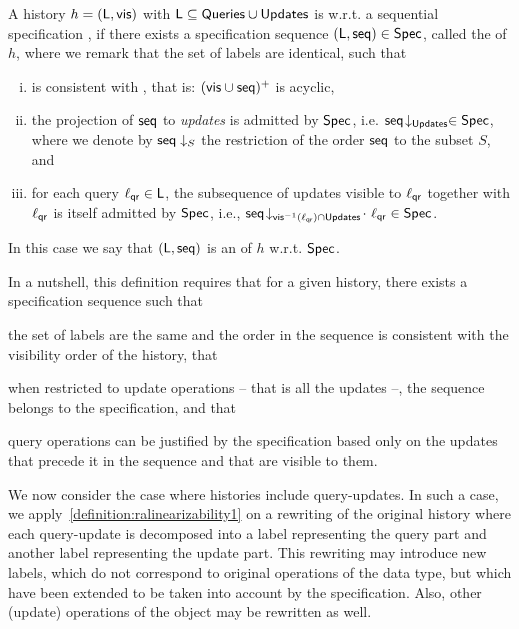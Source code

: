 \begin{definition}
  \label{definition:ralinearizability1} A history $h =
  (\mathsf{L},\mathsf{vis})$ with $\mathsf{L}\subseteq \mathsf{Queries}\cup\mathsf{Updates}$ is \crdtlinearizable{} w.r.t. a
   sequential specification
  \Spec{}, if there exists a specification sequence
  $(\mathsf{L}, \mathsf{seq}) \in \mathsf{Spec}{}$, called the
  \emph{\crdtlinearization{}} of $h$, where we remark that the set of labels
  are identical, such that %
  \begin{enumerate}[(i)]
  \item \aseqord{} is consistent with  \avisord{}, that is: $(\mathsf{vis}
    \cup \mathsf{seq})^{+}$ is acyclic,
  \item the projection of $\mathsf{seq}$ to \emph{updates} is
    admitted by $\mathsf{Spec}$, i.e.
    $\mathsf{seq}\!\downarrow_{\mathsf{Updates}} \in \mathsf{Spec}$, where we denote by
    $\mathsf{seq}\downarrow_{S}$ the restriction of the order $\mathsf{seq}$ to
    the subset $S$, and
  \item for each query $\ell_{\mathsf{qr}}\in \mathsf{L}$, the subsequence of updates visible to $\ell_{\mathsf{qr}}$ together with $\ell_{\mathsf{qr}}$ is itself admitted by $\mathsf{Spec}$, i.e., $\mathsf{seq}\!\downarrow_{\mathsf{vis}^{-1}(\ell_{\mathsf{qr}})\cap \mathsf{Updates}}\!\cdot\
    \ell_{\mathsf{qr}} \in \mathsf{Spec}$.
\end{enumerate}
In this case we say that $(\mathsf{L}, \mathsf{seq})$ is an \emph{\crdtlinearization{}} of $h$ w.r.t. $\mathsf{Spec}{}$.
\end{definition}

In a nutshell, this definition requires that for a given
history, there exists a specification sequence such
that
\begin{inparaenum}
\item the set of labels are the same and the order in the sequence is
  consistent with the visibility order of the history, that
\item when restricted to update operations -- that is all the updates --, the sequence belongs to
  the specification, and that
\item query operations can be justified by the specification based only
  on the updates that precede it in the sequence and that are visible to them.
\end{inparaenum}


We now consider the case where histories include query-updates.
In such a case, we apply~\autoref{definition:ralinearizability1} on a
rewriting of the original history where each query-update is
decomposed into a label representing the query part and another label
representing the update part.
{This rewriting may introduce new labels, which do not correspond to
original operations of the data type, but which have been extended to
be taken into account by the specification.
Also, other (update) operations of the object may be rewritten as
well.}

